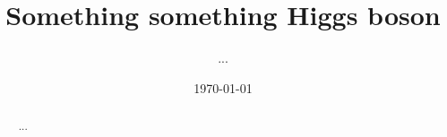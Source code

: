

\usepackage[toc,page]{appendix}
\usepackage{fancyhdr}
\usepackage{enumitem}
\usepackage{pifont}

\pagestyle{fancy}
\rhead{}
\lhead{}

\author{...}
\date{\today}
\title{Something something Higgs boson}


\maketitle
\begin{abstract}
    ...
\end{abstract}

\pagebreak 


% 

